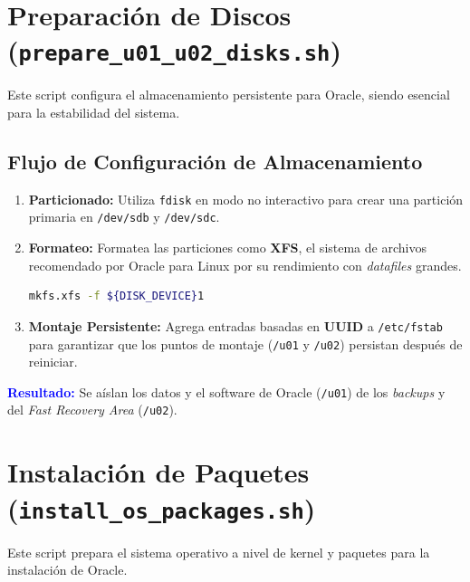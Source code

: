 \documentclass[11pt, a4paper]{report}
\newcommand{\destacado}[1]{\textbf{\textcolor{blue}{#1}}}
\begin{document}
\section{Preparación de Discos (\texttt{prepare\_u01\_u02\_disks.sh})}

Este script configura el almacenamiento persistente para Oracle, siendo esencial para la estabilidad del sistema.
\subsection{Flujo de Configuración de Almacenamiento}
\begin{enumerate}
    \item \textbf{Particionado:} Utiliza \texttt{fdisk} en modo no interactivo para crear una partición primaria en \texttt{/dev/sdb} y \texttt{/dev/sdc}.
\item \textbf{Formateo:} Formatea las particiones como \textbf{XFS}, el sistema de archivos recomendado por Oracle para Linux por su rendimiento con \textit{datafiles} grandes.
\begin{lstlisting}[language=bash, caption={Comando de Formateo XFS}]
mkfs.xfs -f ${DISK_DEVICE}1
        \end{lstlisting}
    \item \textbf{Montaje Persistente:} Agrega entradas basadas en \textbf{UUID} a \texttt{/etc/fstab} para garantizar que los puntos de montaje (\texttt{/u01} y \texttt{/u02}) persistan después de reiniciar.
\end{enumerate}
\destacado{Resultado:} Se aíslan los datos y el software de Oracle (\texttt{/u01}) de los \textit{backups} y del \textit{Fast Recovery Area} (\texttt{/u02}).
\section{Instalación de Paquetes (\texttt{install\_os\_packages.sh})}

Este script prepara el sistema operativo a nivel de kernel y paquetes para la instalación de Oracle.
\end{document}

